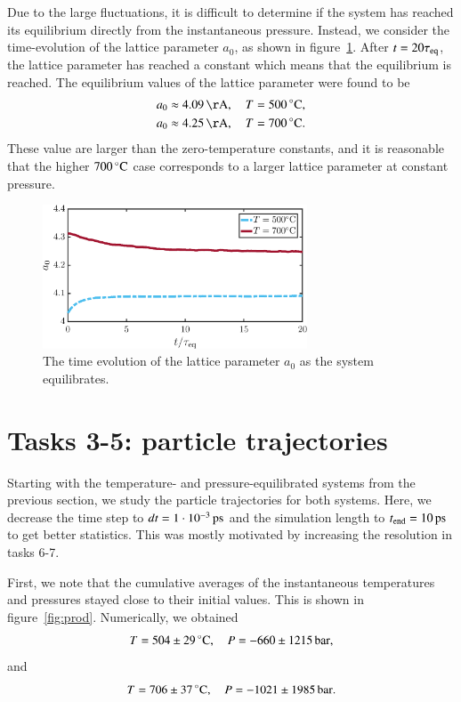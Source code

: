 Due to the large fluctuations, it is difficult to determine if the system has reached its equilibrium directly from the instantaneous pressure. Instead, we consider the time-evolution of the lattice parameter $a_0$, as shown in figure~\ref{fig:a0}. After $t = 20 \tau_{\rm eq}$, the lattice parameter has reached a constant which means that the equilibrium is reached. The equilibrium values of the lattice parameter were found to be 
\begin{align}
a_0 &\approx \unit[4.09]{\AA}, \quad T=\unit[500]{^\circ C}, \\
a_0 &\approx \unit[4.25]{\AA}, \quad T=\unit[700]{^\circ C} .
\end{align} 
These value are larger than the zero-temperature constants, and it is reasonable that the higher $\unit[700]{^\circ C}$ case corresponds to a larger lattice parameter at constant pressure. 
\begin{figure}[!ht]
\begin{center}
  \includegraphics[width=0.7\textwidth]{../figures/a0}  
  \caption{The time evolution of the lattice parameter $a_0$ as the system equilibrates.}
  \label{fig:a0}
\end{center}
\end{figure}



\section*{Tasks 3-5: particle trajectories}
Starting with the temperature- and pressure-equilibrated systems from the previous section, we study the particle trajectories for both systems. Here, we decrease the time step to   $dt       = \unit[1\cdot 10^{-3}]{ps}$ and the simulation length to $t_{\rm end} = \unit[10]{ps}$ to get better statistics. This was mostly motivated by increasing the resolution in tasks 6-7. 

First, we note that the cumulative averages of the instantaneous temperatures and pressures stayed close to their initial values. This is shown in figure~\ref{fig:prod}. Numerically, we obtained 
\begin{equation}
T=\unit[504\pm 29]{^\circ C},\quad  P = \unit[-660 \pm 1215]{bar},
\label{eq:Tprod11}
\end{equation} 
and 
\begin{equation}
T=\unit[706\pm 37]{^\circ C},\quad P = \unit[-1021 \pm 1985]{bar}.
\label{eq:Tprod22}
\end{equation} 

